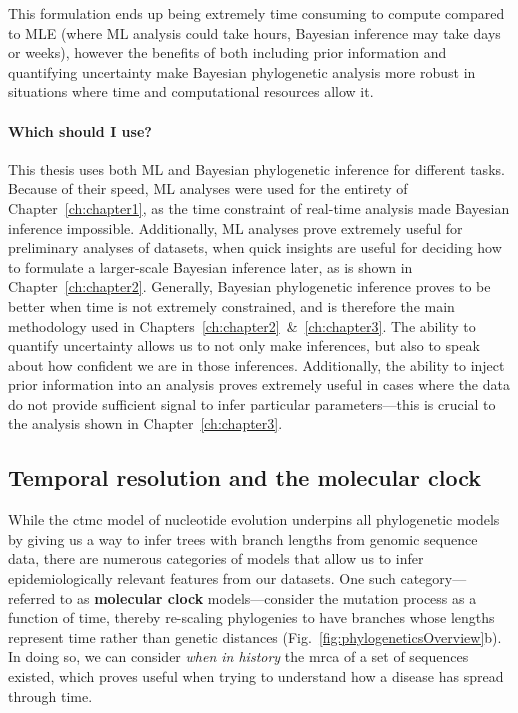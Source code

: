 This formulation ends up being extremely time consuming to compute compared to MLE (where ML analysis could take hours, Bayesian inference may take days or weeks), however the benefits of both including prior information and quantifying uncertainty make Bayesian phylogenetic analysis more robust in situations where time and computational resources allow it.

\paragraph*{Which should I use?}
This thesis uses both ML and Bayesian phylogenetic inference for different tasks.
Because of their speed, ML analyses were used for the entirety of Chapter~\ref{ch:chapter1}, as the time constraint of real-time analysis made Bayesian inference impossible.
Additionally, ML analyses prove extremely useful for preliminary analyses of datasets, when quick insights are useful for deciding how to formulate a larger-scale Bayesian inference later, as is shown in Chapter~\ref{ch:chapter2}.
Generally, Bayesian phylogenetic inference proves to be better when time is not extremely constrained, and is therefore the main methodology used in Chapters~\ref{ch:chapter2}~\&~\ref{ch:chapter3}.
The ability to quantify uncertainty allows us to not only make inferences, but also to speak about how confident we are in those inferences.
Additionally, the ability to inject prior information into an analysis proves extremely useful in cases where the data do not provide sufficient signal to infer particular parameters---this is crucial to the analysis shown in Chapter~\ref{ch:chapter3}.

\subsection{Temporal resolution and the molecular clock}\label{ssec:molClock}
While the \gls{ctmc} model of nucleotide evolution underpins all phylogenetic models by giving us a way to infer trees with branch lengths from genomic sequence data, there are numerous categories of models that allow us to infer epidemiologically relevant features from our datasets.
One such category---referred to as \textbf{molecular clock} models---consider the mutation process as a function of time, thereby re-scaling phylogenies to have branches whose lengths represent time rather than genetic distances (Fig.~\ref{fig:phylogeneticsOverview}b).
In doing so, we can consider \textit{when in history} the \gls{mrca} of a set of sequences existed, which proves useful when trying to understand how a disease has spread through time.

